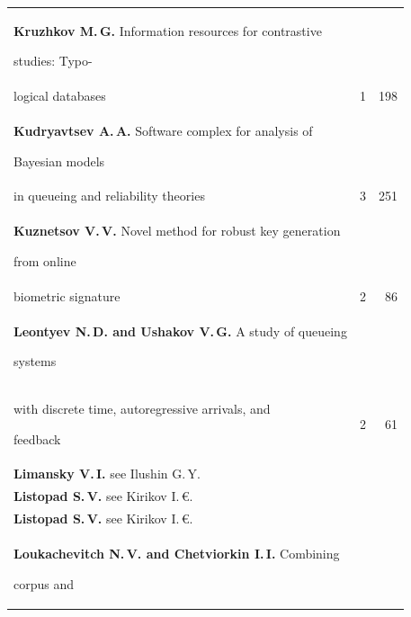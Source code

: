 {\begin{tabular}{p{311pt}rr}
\textbf{Kruzhkov M.\,G.} Information resources for contrastive


studies: Typo-\linebreak


\\[-12pt]


\hspace*{21pt}logical databases&1&198\\


\textbf{Kudryavtsev A.\,A.} Software complex for analysis of


Bayesian models\linebreak


\\[-12pt]


\hspace*{21pt}in queueing and reliability theories&3&251\\


\textbf{Kuznetsov V.\,V.} Novel method for robust key generation


from online\linebreak


\\[-12pt]


\hspace*{21pt}biometric signature&2&86\\


\textbf{Leontyev N.\,D. and Ushakov V.\,G.} A study of queueing


systems\linebreak


\\[-12pt]


\hspace*{21pt}with discrete time, autoregressive arrivals, and


feedback&2&61\\


\textbf{Limansky V.\,I.} see Ilushin G.\,Y.&&\\


\textbf{Listopad S.\,V.} see Kirikov I.\,€.&&\\


\textbf{Listopad S.\,V.} see Kirikov I.\,€.&&\\


\textbf{Loukachevitch N.\,V. and Chetviorkin I.\,I.} Combining


corpus and\linebreak


\\[-12pt]



\end{tabular}}
